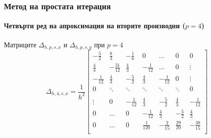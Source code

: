 \documentclass{beamer}
\begin{document}
\begin{frame}
\frametitle{Метод на простата итерация}
\framesubtitle{Четвърти ред на апроксимация на вторите производни ($p=4$)}
Матриците $\Delta_{h,p,s,x}$ и $\Delta_{h,p,s,y}$ при $p=4$
\[
\Delta_{h,4,s,x} = \frac{1}{h^2}
\begin{bmatrix}
     -\frac{5}{2}	& \frac{8}{3}       & -\frac{1}{6}	&    0     			&    \dots      	   &   0           & 0    \\
    \frac{4}{3}          &-\frac{31}{12}    	& \frac{4}{3}	&   -\frac{1}{12}	  	&   \dots      	  &   0	           & \vdots  \\
    -\frac{1}{12}	& \frac{4}{3}         	& -\frac{5}{2}	&  \frac{4}{3}    	 &   -\frac{1}{12}	  &      0           &\vdots    \\
        0           		& \ddots        	&    \ddots   		 &   \ddots      	 &     \ddots      	  &  \ddots        &    0 \\	
\\
   \vdots      		 & 0           		 &  -\frac{1}{12}	& \frac{4}{3}    	& -\frac{5}{2}	&  \frac{4}{3}   &   -\frac{1}{12} \\
    0      		 &  \dots           	 &   0     		& -\frac{1}{12} 	 & \frac{4}{3} 	 & -\frac{5}{2}  &  \frac{4}{3}\\
    0              		 & \dots          	&  0              		 &\frac{1}{120} 	 &  -\frac{2}{15} 	& \frac{29}{20} & -\frac{38}{15}\\
\end{bmatrix}
\]
\end{frame}
\end{document}
